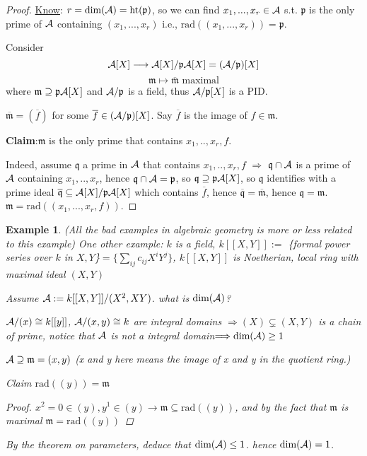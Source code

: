 \documentclass[11pt]{article}
\newtheorem{ex}[thm]{Example}
\newcommand{\scm}{{\mathfrak m}}
\newcommand{\scp}{{\mathfrak p}}
\newcommand{\scq}{\mathfrak q}
\newcommand{\cala}{{\cal A}}
\newcommand{\rta}{\rightarrow}
\newcommand{\Lrta}{\Longrightarrow}
\newcommand{\lrta}{\longrightarrow}
\begin{document}
\begin{proof}
\underline{Know}: $r=\text{dim}(\cala)=\text{ht}(\scp)$, so we can find $x_1,...,x_r\in\cala$ s.t.
$\scp$ is the only prime of $\cala$ containing $(x_1,...,x_r)$ i.e., $\text{rad}((x_1,...,x_r))=\scp.$

Consider
$$
\cala[X]\lrta\cala[X]/\scp\cala[X]=(\cala/\scp)[X]$$
$$
\scm\longmapsto\overline{\scm}\text{ maximal}
$$
where $\scm\supseteq\scp\cala[X]$ and $\cala/\scp$ is a field, thus $\cala/\scp[X]$ is a PID.

$\overline{\scm}=(\overline{f})$ for some $\overline{f}\in(\cala/\scp)[X]$. Say $\overline{f}$ is the image of $f\in\scm$.

\textbf{Claim}:$\scm$ is the only prime  that contains $x_1,..,x_r,f.$

Indeed, assume $\scq$ a prime in $\cala$ that contains $x_1,..,x_r,f$ $\Lrta$ $\scq\cap \cala$ is a prime of $\cala$ containing $x_1,..,x_r$, hence $\scq\cap \cala=\scp$, so $\scq\supseteq \scp\cala[X]$, so $\scq$ identifies with a prime ideal $\overline{\scq}\subseteq \cala[X]/\scp\cala[X]$ which contains $\overline{f}$, hence $\overline{\scq}=\overline{\scm}$, hence $\scq=\scm$. $\scm=\text{rad}((x_1,...,x_r,f))$.

\end{proof}

\begin{ex}(All the bad examples in algebraic geometry is more or less related to this example)
One other example: $k$ is a field, $k[[X,Y]]:=$ \{formal power series over $k$ in $X,Y$\}$=\{\sum_{ij}c_{ij} X^i Y^j\}$, $k[[X,Y]]$ is Noetherian, local ring with maximal ideal $(X,Y)$

Assume $\cala:=k[[X,Y]]/(X^2,XY)$. what is  $\text{dim}(\cala)$?

$\cala/(x)\cong k[[y]]$, $\cala/(x,y)\cong k$ are integral domains $\Lrta (X)\subsetneq (X,Y)$ is a chain of prime, notice that $\cala$ is not a integral domain$\Lrta \text{dim}(\cala)\geq 1$

$\cala\supseteq \scm=(x,y)$ (x and y here means the image of x and y in the quotient ring.)

Claim $\text{rad}((y))=\scm$
\begin{proof}
$x^2=0\in(y), y^1\in(y)\rta \scm\subseteq \text{rad}((y))$, and by the fact that $\scm $ is maximal $\scm=\text{rad}((y))$
\end{proof}
By the theorem on parameters, deduce that $\text{dim}(\cala)\leq 1$. hence $\text{dim}(\cala)=1$.
\end{ex}
\end{document}

